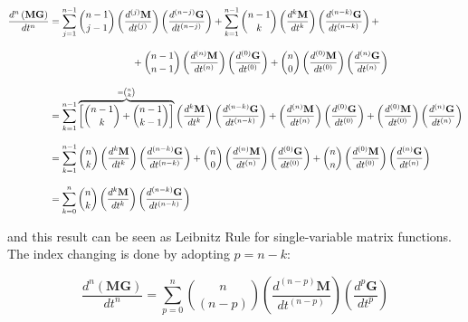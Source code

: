 \small
\begin{align}
	\dfrac{d^n\left(\mathbf{MG}\right)}{dt^n}
	&= \sum\limits_{j=1}^{n-1} {n-1\choose j-1} \left(\dfrac{d^{\left(j\right)} \mathbf{M}}{dt^{\left(j\right)}}\right)  \left(\dfrac{d^{\left(n-j\right)} \mathbf{G}}{dt^{\left(n-j\right)}}\right) + \sum\limits_{k=1}^{n-1}{n-1\choose k}\left(\dfrac{d^{k} \mathbf{M}}{dt^k}\right)  \left(\dfrac{d^{\left(n-k\right)} \mathbf{G}}{dt^{\left(n-k\right)}}\right) + \nonumber\\[3mm] &\hspace{30mm} + {n-1\choose n-1}\left(\dfrac{d^{\left(n\right)} \mathbf{M}}{dt^{\left(n\right)}}\right)  \left(\dfrac{d^{\left(0\right)} \mathbf{G}}{dt^{\left(0\right)}}\right) + {n\choose 0}\left(\dfrac{d^{\left(0\right)} \mathbf{M}}{dt^{\left(0\right)}}\right)  \left(\dfrac{d^{\left(n\right)} \mathbf{G}}{dt^{\left(n\right)}}\right) \nonumber\\[3mm]
%
%
%
	&= \sum\limits_{k=1}^{n-1} \overbrace{\left[{n-1\choose k} + {n-1\choose k-1}\right]}^{={n\choose k}} \left(\dfrac{d^{k} \mathbf{M}}{dt^k}\right)  \left(\dfrac{d^{\left(n-k\right)} \mathbf{G}}{dt^{\left(n-k\right)}}\right) + \left(\dfrac{d^{\left(n\right)} \mathbf{M}}{dt^{\left(n\right)}}\right)  \left(\dfrac{d^{\left(0\right)} \mathbf{G}}{dt^{\left(0\right)}}\right) + \left(\dfrac{d^{\left(0\right)} \mathbf{M}}{dt^{\left(0\right)}}\right)  \left(\dfrac{d^{\left(n\right)} \mathbf{G}}{dt^{\left(n\right)}}\right) \nonumber\\[3mm]
	&= \sum\limits_{k=1}^{n-1} {n\choose k} \left(\dfrac{d^{k} \mathbf{M}}{dt^k}\right) \left(\dfrac{d^{\left(n-k\right)} \mathbf{G}}{dt^{\left(n-k\right)}}\right) + {n\choose 0}\left(\dfrac{d^{\left(n\right)} \mathbf{M}}{dt^{\left(n\right)}}\right)  \left(\dfrac{d^{\left(0\right)} \mathbf{G}}{dt^{\left(0\right)}}\right) + {n\choose n}\left(\dfrac{d^{\left(0\right)} \mathbf{M}}{dt^{\left(0\right)}}\right)  \left(\dfrac{d^{\left(n\right)} \mathbf{G}}{dt^{\left(n\right)}}\right) \nonumber\\[3mm]
	&= \sum\limits_{k=0}^{n} {n\choose k} \left(\dfrac{d^{k} \mathbf{M}}{dt^k}\right) \left(\dfrac{d^{\left(n-k\right)} \mathbf{G}}{dt^{\left(n-k\right)}}\right) 
\end{align}
\normalsize

	\noindent and this result can be seen as Leibnitz Rule for single-variable matrix functions. The index changing is done by adopting $p = n-k$:

\begin{equation} \dfrac{d^n\left(\mathbf{MG}\right)}{dt^n} = \sum\limits_{p=0}^{n} {n\choose \left(n-p\right)} \left(\dfrac{d^{\left(n-p\right)} \mathbf{M}}{dt^{\left(n-p\right)}}\right) \left(\dfrac{d^p \mathbf{G}}{dt^p}\right) \end{equation}

